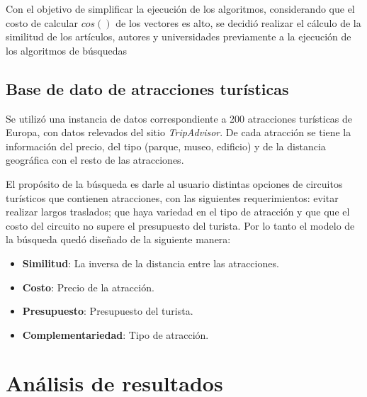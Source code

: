 
Con el objetivo de simplificar la ejecución de los algoritmos, considerando que el costo de calcular $cos()$ de los vectores es alto, se decidió realizar el cálculo de la similitud de los artículos, autores y universidades previamente a la ejecución de los algoritmos de búsquedas

\subsection{Base de dato de atracciones turísticas}
Se utilizó una instancia de datos correspondiente a 200 atracciones turísticas de Europa, con datos relevados del sitio \textit{TripAdvisor}. De cada atracción se tiene la información del precio, del tipo (parque, museo, edificio) y de la distancia geográfica con el resto de las atracciones.

El propósito de la búsqueda es darle al usuario distintas opciones de circuitos turísticos que contienen atracciones, con las siguientes requerimientos: evitar realizar largos traslados; que haya variedad en el tipo de atracción y que que el costo del circuito no supere el presupuesto del turista. Por lo tanto el modelo de la búsqueda quedó diseñado de la siguiente manera: \label{busqueda:atracciones}

\begin{itemize}
	\item \textbf{Similitud}: La inversa de la distancia entre las atracciones. 
	\item \textbf{Costo}: Precio de la atracción. 
	\item \textbf{Presupuesto}: Presupuesto del turista. 
	\item \textbf{Complementariedad}: Tipo de atracción.
\end{itemize}

\section{Análisis de resultados}\label{sect:resultados}

